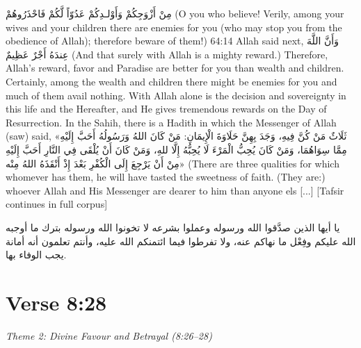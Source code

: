 \documentclass[11pt,a4paper,openany]{book}
\let\textAR\textarabic
\begin{document}
\begin{tafsirbox}
\textAR{مِنْ} \textAR{أَزْوَجِكُمْ} \textAR{وَأَوْلـدِكُمْ} \textAR{عَدُوّاً} \textAR{لَّكُمْ} \textAR{فَاحْذَرُوهُمْ} (O you who believe! Verily, among your wives and your children there are enemies for you (who may stop you from the obedience of Allah); therefore beware of them!) 64:14 Allah said next, \textAR{وَأَنَّ} \textAR{اللَّهَ} \textAR{عِندَهُ} \textAR{أَجْرٌ} \textAR{عَظِيمٌ} (And that surely with Allah is a mighty reward.) Therefore, Allah's reward, favor and Paradise are better for you than wealth and children. Certainly, among the wealth and children there might be enemies for you and much of them avail nothing. With Allah alone is the decision and sovereignty in this life and the Hereafter, and He gives tremendous rewards on the Day of Resurrection. In the Sahih, there is a Hadith in which the Messenger of Allah (saw) said, \textAR{«ثَلَاثٌ} \textAR{مَنْ} \textAR{كُنَّ} \textAR{فِيهِ،} \textAR{وَجَدَ} \textAR{بِهِنَّ} \textAR{حَلَاوَةَ} \textAR{الْإِيمَانِ}: \textAR{مَنْ} \textAR{كَانَ} \textAR{اللهُ} \textAR{وَرَسُولُهُ} \textAR{أَحَبَّ} \textAR{إِلَيْهِ} \textAR{مِمَّا} \textAR{سِوَاهُمَا،} \textAR{وَمَنْ} \textAR{كَانَ} \textAR{يُحِبُّ} \textAR{الْمَرْءَ} \textAR{لَا} \textAR{يُحِبُّهُ} \textAR{إِلَّا} \textAR{للهِ،} \textAR{وَمَنْ} \textAR{كَانَ} \textAR{أَنْ} \textAR{يُلْقَى} \textAR{فِي} \textAR{النَّارِ} \textAR{أَحَبَّ} \textAR{إِلَيْهِ} \textAR{مِنْ} \textAR{أَنْ} \textAR{يَرْجِعَ} \textAR{إِلَى} \textAR{الْكُفْرِ} \textAR{بَعْدَ} \textAR{إِذْ} \textAR{أَنْقَذَهُ} \textAR{اللهُ} \textAR{مِنْه»} (There are three qualities for which whomever has them, he will have tasted the sweetness of faith. (They are:) whoever Allah and His Messenger are dearer to him than anyone els [...] [Tafsir continues in full corpus]
\end{tafsirbox}


\begin{muyassarbox}
\textAR{يا أيها الذين صدَّقوا الله ورسوله وعملوا بشرعه لا تخونوا الله ورسوله بترك ما أوجبه الله عليكم وفِعْل ما نهاكم عنه، ولا تفرطوا فيما ائتمنكم الله عليه، وأنتم تعلمون أنه أمانة يجب الوفاء بها.}
\end{muyassarbox}


\newpage

\section{Verse 8:28}
{\small\color{accent2}\itshape Theme 2: Divine Favour and Betrayal (8:26--28)}
\end{document}
